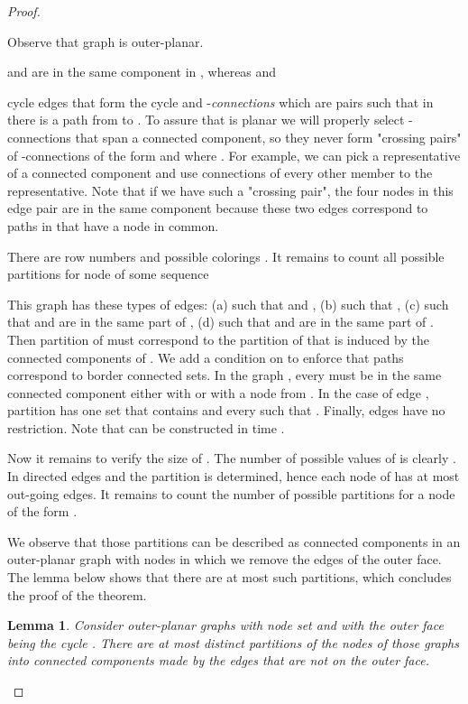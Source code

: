 \documentclass[11pt,english]{article}
\renewenvironment{enumerate}[1]{\begin{compactenum}#1}{\end{compactenum}}
\newtheorem{lemma}[theorem]{Lemma}
\numberwithin{figure}{section}
\begin{document}
\begin{proof}
\begin{enumerate}
Observe that graph  is outer-planar.


 and  are in the same component in , whereas  and 
\end{enumerate}
cycle edges that form the cycle  and
-{\it connections} which are
pairs  such that in  there is a path from  to .
To assure that  is planar we will properly select -connections
that span a connected component, so they never form
"crossing pairs" of -connections of the form
 and
 where .  For example, we can pick
a representative of a connected component and use connections of every
other member to the representative.
Note that if we have such a "crossing pair", the four nodes in this edge
pair are in the same component because these two edges correspond to
paths in  that have a node in common.

There are  row numbers and  possible colorings . It remains to count all possible partitions  for node  of some sequence



This graph has these types of edges:
(a)  such that  and , (b)
 such that ,
(c) 
such that  and  are in the same part of , (d) 
such that  and  are in the same part of .  Then partition 
of  must
correspond to the partition of  that is induced by
the connected components of . We add a condition on  to enforce that paths correspond to border
connected sets.  In the graph , every  must be in the same connected component either with  or with
a node from . In the case of edge , partition  has one set that
contains  and every  such that . Finally, edges  have
no restriction. Note that  can be constructed in time .

Now it remains to verify the size of .  The number of possible values
of  is clearly .  In directed edges  and
 the partition  is determined, hence
each node of  has at most  out-going edges.  It remains to count
the number of possible partitions  for a node of the form .

We observe that those partitions can be described as connected components
in an outer-planar graph with  nodes in which we
remove the edges of the outer face.  The lemma below shows that there
are at most  such partitions, which concludes the proof of the theorem.



\begin{lemma} Consider outer-planar graphs with node set  and with the
outer face being the cycle .  There are at most 
distinct partitions of the nodes of those graphs into connected components
made by the edges that are not on the outer face.\end{lemma}


\end{proof}
\end{document}
